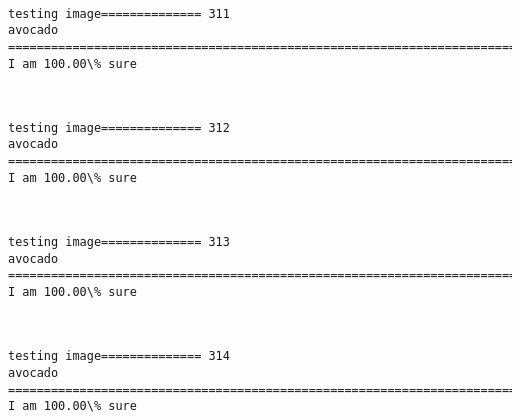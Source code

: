 \documentclass[11pt]{article}
\begin{document}
    \begin{center}
    \end{center}
    { \hspace*{\fill} \\}
    
    \begin{Verbatim}[commandchars=\\\{\}]
testing image============== 311
avocado
============================================================================
I am 100.00\% sure

    \end{Verbatim}

    \begin{center}
    \end{center}
    { \hspace*{\fill} \\}
    
    \begin{Verbatim}[commandchars=\\\{\}]
testing image============== 312
avocado
============================================================================
I am 100.00\% sure

    \end{Verbatim}

    \begin{center}
    \end{center}
    { \hspace*{\fill} \\}
    
    \begin{Verbatim}[commandchars=\\\{\}]
testing image============== 313
avocado
============================================================================
I am 100.00\% sure

    \end{Verbatim}

    \begin{center}
    \end{center}
    { \hspace*{\fill} \\}
    
    \begin{Verbatim}[commandchars=\\\{\}]
testing image============== 314
avocado
============================================================================
I am 100.00\% sure

    \end{Verbatim}
\end{document}
